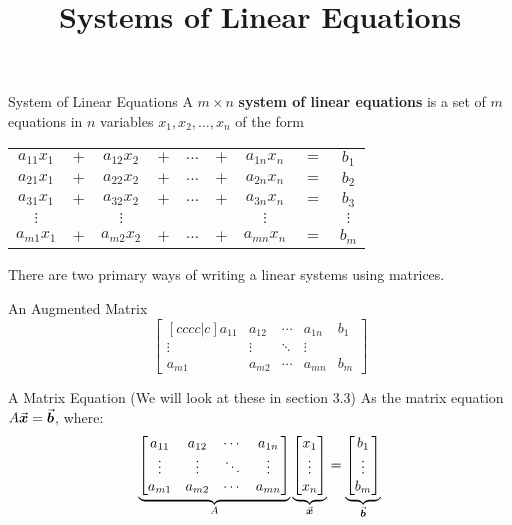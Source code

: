 \documentclass{beamer}
\title[MATH 2250 - Section 3.2]{Systems of Linear Equations}
\begin{document}
\begin{frame}
  \titlepage
\end{frame}

\begin{frame}
\begin{block}{System of Linear Equations}
A $m\times n$ \textbf{system of linear equations} is a set of $m$ equations in $n$ variables $x_1,x_2,\dots,x_n$ of the form
\begin{center}
\begin{tabular}{ccccccccc}
$a_{11}x_1$&$+$&$a_{12}x_2$&$+$&$\dots$&$+$&$a_{1n}x_n$&$=$&$b_1$\\
$a_{21}x_1$&$+$&$a_{22}x_2$&$+$&$\dots$&$+$&$a_{2n}x_n$&$=$&$b_2$\\
$a_{31}x_1$&$+$&$a_{32}x_2$&$+$&$\dots$&$+$&$a_{3n}x_n$&$=$&$b_3$\\
$\vdots$&&$\vdots$&&&&$\vdots$&&$\vdots$\\
$a_{m1}x_1$&$+$&$a_{m2}x_2$&$+$&$\dots$&$+$&$a_{mn}x_n$&$=$&$b_m$\\
\end{tabular}
\end{center}
\end{block}
\end{frame}

\begin{frame}
\begin{block}{}
There are two primary ways of writing a linear systems using matrices.
\end{block}\pause
\begin{block}{An Augmented Matrix}
\begin{equation*}
\begin{bmatrix}[cccc|c]
a_{11}&a_{12}&\cdots&a_{1n}&b_1\\
\vdots&\vdots&\ddots&\vdots&\\
a_{m1}&a_{m2}&\cdots&a_{mn}&b_m
\end{bmatrix}
\end{equation*}
\end{block}\pause
\begin{block}{A Matrix Equation (We will look at these in section 3.3)}
As the matrix equation $A{\vec{\boldsymbol{x}}}={\vec{\boldsymbol{b}}}$, where:
\begin{equation*}
\underbrace{\begin{bmatrix}
a_{11}&a_{12}&\cdots&a_{1n}\\
\vdots&\vdots&\ddots&\vdots\\
a_{m1}&a_{m2}&\cdots&a_{mn}
\end{bmatrix}}_A
\underbrace{\begin{bmatrix}
x_1\\\vdots\\x_n
\end{bmatrix}}_{\vec{\boldsymbol{x}}}
=
\underbrace{\begin{bmatrix}
b_1\\\vdots\\b_m
\end{bmatrix}}_{\vec{\boldsymbol{b}}}
\end{equation*}
\end{block}
\end{frame}
\end{document}
